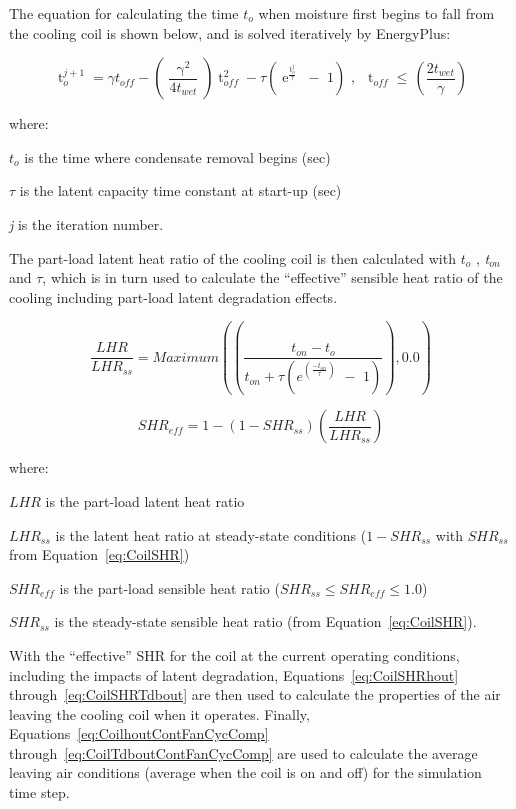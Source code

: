 The equation for calculating the time \(t_{o}\) when moisture first begins to fall from the cooling coil is shown below, and is solved iteratively by EnergyPlus:

\begin{equation}
\mathop t\nolimits_o^{j + 1}  = \gamma {t_{off}} - \left( {\frac{{\mathop \gamma \nolimits^2 }}{{4{t_{wet}}}}} \right)\mathop t\nolimits_{off}^2  - \tau \left( {\mathop e\nolimits^{\frac{{\mathop t\nolimits_o^j }}{\tau }} \,\, - \,\,1} \right)\,\,,\,\,\,\mathop t\nolimits_{off}^{}  \le \,\left( {\frac{{2{t_{wet}}}}{\gamma }} \right)
\end{equation}

where:

\({t_o}\) is the time where condensate removal begins (sec)

\(\tau\) is the latent capacity time constant at start-up (sec)

\emph{j} is the iteration number.

The part-load latent heat ratio of the cooling coil is then calculated with \(t_o\) , \emph{t\(_{on}\)} and \(\tau\), which is in turn used to calculate the ``effective'' sensible heat ratio of the cooling including part-load latent degradation effects.

\begin{equation}
\frac{{LHR}}{{LH{R_{ss}}}} = Maximum\left( {\left( {\frac{{{t_{on}} - {t_o}}}{{{t_{on}} + \tau \left( {{e^{\left( {\frac{{ - {t_{on}}}}{\tau }} \right)}}\,\, - \,\,1} \right)}}} \right),0.0} \right)
\end{equation}

\begin{equation}
SH{R_{eff}} = 1 - \left( {1 - SH{R_{ss}}} \right)\left( {\frac{{LHR}}{{LH{R_{ss}}}}} \right)
\end{equation}

where:

\(LHR\) is the part-load latent heat ratio

\(LH{R_{ss}}\) is the latent heat ratio at steady-state conditions (\(1 - SH{R_{ss}}\) with \(SH{R_{ss}}\) from Equation~\ref{eq:CoilSHR})

\(SHR_{eff}\) is the part-load sensible heat ratio (\(SHR_{ss} \le SHR_{eff} \le 1.0\))

\(SH{R_{ss}}\) is the steady-state sensible heat ratio (from Equation~\ref{eq:CoilSHR}).

With the ``effective'' SHR for the coil at the current operating conditions, including the impacts of latent degradation, Equations~\ref{eq:CoilSHRhout} through~\ref{eq:CoilSHRTdbout} are then used to calculate the properties of the air leaving the cooling coil when it operates. Finally, Equations~\ref{eq:CoilhoutContFanCycComp} through~\ref{eq:CoilTdboutContFanCycComp} are used to calculate the average leaving air conditions (average when the coil is on and off) for the simulation time step.

